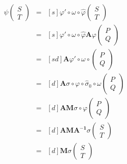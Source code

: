 \documentclass[12pt,a4paper]{article}
\begin{document}
		\begin{eqnarray*}
			[s]\psi\begin{pmatrix} S \\ T \end{pmatrix} & = & [s]\varphi'\circ\omega\circ
			\widehat\varphi\begin{pmatrix} S \\ T \end{pmatrix} \\
																									&=& [s]\varphi'\circ\omega\circ\widehat
																									\varphi\mathbf A\varphi
																									\begin{pmatrix} P \\ Q \end{pmatrix} \\
																									& =&[sd]\mathbf A\varphi'\circ\omega\circ
																									\begin{pmatrix} P \\ Q \end{pmatrix}  \\
																									&=&[d]\mathbf A\sigma\circ\varphi\circ\widehat\sigma_0
																									\circ\omega\begin{pmatrix} P \\ Q \end{pmatrix}  \\
																									&=&[d]\mathbf{AM}\sigma\circ\varphi
																									\begin{pmatrix} P \\ Q \end{pmatrix} \\
																									&=&[d]\mathbf{AMA^{-1}}\sigma\begin{pmatrix} S \\ T \end{pmatrix} \\
																									&=&[d]\mathbf{M}\sigma\begin{pmatrix} S \\ T \end{pmatrix} 
		\end{eqnarray*}

\end{document}
